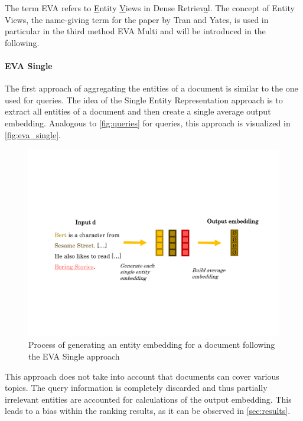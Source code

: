 The term EVA refers to \underline{E}ntity \underline{V}iews in Dense Retriev\underline{a}l. The concept of Entity Views, the name-giving term for the paper by Tran and Yates, is used in particular in the third method EVA Multi and will be introduced in the following.

\paragraph*{EVA Single}

The first approach of aggregating the entities of a document is similar to the one used for queries. The idea of the Single Entity Representation approach is to extract all entities of a document and then create a single average output embedding. Analogous to \autoref{fig:queries} for queries, this approach is visualized in \autoref{fig:eva_single}.

\begin{figure}[!htb]
    \centering
    \includegraphics[trim={2cm 6cm 1.5cm 6cm}, clip, width=\textwidth]{resources/eva_single} 
    \caption{Process of generating an entity embedding for a document following the EVA Single approach}
    \label{fig:eva_single}
\end{figure}

This approach does not take into account that documents can cover various topics. The query information is completely discarded and thus partially irrelevant entities are accounted for calculations of the output embedding. This leads to a bias within the ranking results, as it can be observed in \autoref{sec:results}.

